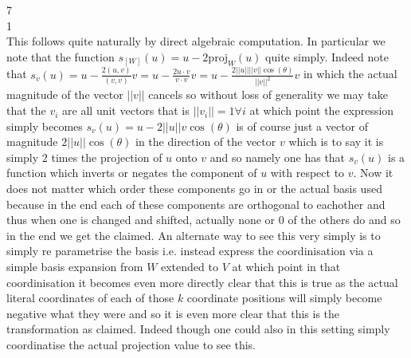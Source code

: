 7 \\
1 \\
This follows quite naturally by direct algebraic computation. In particular we note that the function $s_{[W]}(u) = u - 2 \text{proj}_W (u)$ quite simply. Indeed note that $s_v (u) = u - \frac{2(u,v)}{(v,v)}v = u - \frac{2 u \cdot v}{v \cdot v}v = u - \frac{2 ||u|| ||v|| \cos (\theta)}{||v||^2}v$ in which the actual magnitude of the vector $||v||$ cancels so without loss of generality we may take that the $v_i$ are all unit vectors that is $||v_i|| = 1 \forall i$ at which point the expression simply becomes $s_v (u) = u - 2 ||u||v \cos(\theta)$ is of course just a vector of magnitude $2||u|| \cos(\theta)$ in the direction of the vector $v$ which is to say it is simply $2$ times the projection of $u$ onto $v$ and so namely one has that $s_v (u)$ is a function which inverts or negates the component of $u$ with respect to $v$. Now it does not matter which order these components go in or the actual basis used because in the end each of these components are orthogonal to eachother and thus when one is changed and shifted, actually none or $0$ of the others do and so in the end we get the claimed. An alternate way to see this very simply is to simply re parametrise the basis i.e. instead express the coordinisation via a simple basis expansion from $W$ extended to $V$ at which point in that coordinisation it becomes even more directly clear that this is true as the actual literal coordinates of each of those $k$ coordinate positions will simply become negative what they were and so it is even more clear that this is the transformation as claimed. Indeed though one could also in this setting simply coordinatise the actual projection value to see this.


